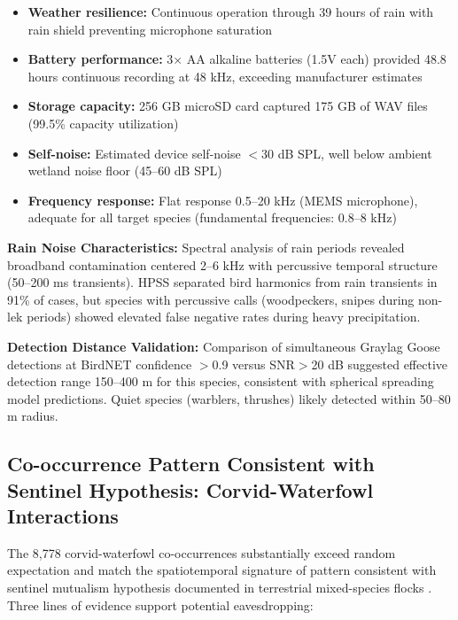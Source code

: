 \documentclass[twocolumn]{article}
\begin{document}
\begin{itemize}
\item \textbf{Weather resilience:} Continuous operation through 39 hours of rain with rain shield preventing microphone saturation
\item \textbf{Battery performance:} 3× AA alkaline batteries (1.5V each) provided 48.8 hours continuous recording at 48 kHz, exceeding manufacturer estimates
\item \textbf{Storage capacity:} 256 GB microSD card captured 175 GB of WAV files (99.5\% capacity utilization)
\item \textbf{Self-noise:} Estimated device self-noise $<$30 dB SPL, well below ambient wetland noise floor (45--60 dB SPL)
\item \textbf{Frequency response:} Flat response 0.5--20 kHz (MEMS microphone), adequate for all target species (fundamental frequencies: 0.8--8 kHz)
\end{itemize}

\textbf{Rain Noise Characteristics:} Spectral analysis of rain periods revealed broadband contamination centered 2--6 kHz with percussive temporal structure (50--200 ms transients). HPSS separated bird harmonics from rain transients in 91\% of cases, but species with percussive calls (woodpeckers, snipes during non-lek periods) showed elevated false negative rates during heavy precipitation.

\textbf{Detection Distance Validation:} Comparison of simultaneous Graylag Goose detections at BirdNET confidence $>$0.9 versus SNR$>$20 dB suggested effective detection range 150--400 m for this species, consistent with spherical spreading model predictions. Quiet species (warblers, thrushes) likely detected within 50--80 m radius.

\subsection{Co-occurrence Pattern Consistent with Sentinel Hypothesis: Corvid-Waterfowl Interactions}

The 8,778 corvid-waterfowl co-occurrences substantially exceed random expectation and match the spatiotemporal signature of pattern consistent with sentinel mutualism hypothesis documented in terrestrial mixed-species flocks \citep{Magrath2015}. Three lines of evidence support potential eavesdropping:
\end{document}
